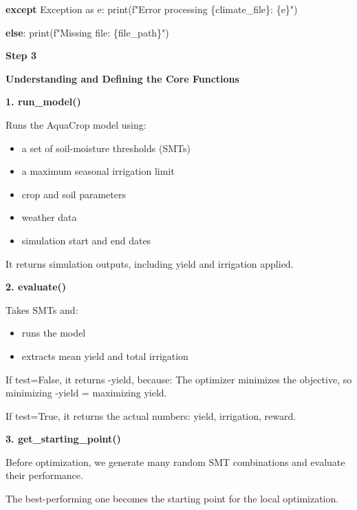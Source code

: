 \documentclass[
  letterpaper,
  DIV=11,
  numbers=noendperiod]{scrartcl}
\newenvironment{Shaded}{\begin{snugshade}}{\end{snugshade}}
\newcommand{\BuiltInTok}[1]{\textcolor[rgb]{0.00,0.23,0.31}{#1}}
\newcommand{\ControlFlowTok}[1]{\textcolor[rgb]{0.00,0.23,0.31}{\textbf{#1}}}
\newcommand{\ImportTok}[1]{\textcolor[rgb]{0.00,0.46,0.62}{#1}}
\newcommand{\NormalTok}[1]{\textcolor[rgb]{0.00,0.23,0.31}{#1}}
\newcommand{\PreprocessorTok}[1]{\textcolor[rgb]{0.68,0.00,0.00}{#1}}
\newcommand{\SpecialCharTok}[1]{\textcolor[rgb]{0.37,0.37,0.37}{#1}}
\newcommand{\SpecialStringTok}[1]{\textcolor[rgb]{0.13,0.47,0.30}{#1}}
\begin{document}
\begin{Shaded}
\begin{Highlighting}[]
        \ControlFlowTok{except} \PreprocessorTok{Exception} \ImportTok{as}\NormalTok{ e:}
            \BuiltInTok{print}\NormalTok{(}\SpecialStringTok{f"Error processing }\SpecialCharTok{\{}\NormalTok{climate\_file}\SpecialCharTok{\}}\SpecialStringTok{: }\SpecialCharTok{\{}\NormalTok{e}\SpecialCharTok{\}}\SpecialStringTok{"}\NormalTok{)}

    \ControlFlowTok{else}\NormalTok{:}
        \BuiltInTok{print}\NormalTok{(}\SpecialStringTok{f"Missing file: }\SpecialCharTok{\{}\NormalTok{file\_path}\SpecialCharTok{\}}\SpecialStringTok{"}\NormalTok{)}
\end{Highlighting}
\end{Shaded}

\textbf{Step 3}

\textbf{Understanding and Defining the Core Functions}

\textbf{1. run\_model()}

Runs the AquaCrop model using:

\begin{itemize}
\item
  a set of soil-moisture thresholds (SMTs)
\item
  a maximum seasonal irrigation limit
\item
  crop and soil parameters
\item
  weather data
\item
  simulation start and end dates
\end{itemize}

It returns simulation outputs, including yield and irrigation applied.

\textbf{2. evaluate()}

Takes SMTs and:

\begin{itemize}
\item
  runs the model
\item
  extracts mean yield and total irrigation
\end{itemize}

If test=False, it returns -yield, because: The optimizer minimizes the
objective, so minimizing -yield = maximizing yield.

If test=True, it returns the actual numbers: yield, irrigation, reward.

\textbf{3. get\_starting\_point()}

Before optimization, we generate many random SMT combinations and
evaluate their performance.

The best-performing one becomes the starting point for the local
optimization.
\end{document}
